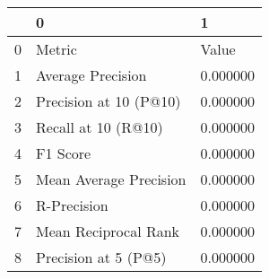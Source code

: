 \begin{tabular}{lll}
\toprule
 & 0 & 1 \\
\midrule
0 & Metric & Value \\
1 & Average Precision & 0.000000 \\
2 & Precision at 10 (P@10) & 0.000000 \\
3 & Recall at 10 (R@10) & 0.000000 \\
4 & F1 Score & 0.000000 \\
5 & Mean Average Precision & 0.000000 \\
6 & R-Precision & 0.000000 \\
7 & Mean Reciprocal Rank & 0.000000 \\
8 & Precision at 5 (P@5) & 0.000000 \\
\bottomrule
\end{tabular}

